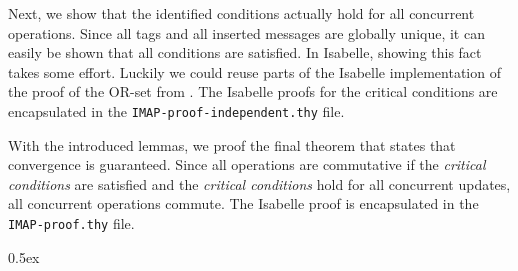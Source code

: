 \documentclass[11pt,a4paper, DIV=11]{article}
\begin{document}
Next, we show that the identified conditions actually hold for all concurrent
operations. Since all tags and all inserted messages are globally unique, it can easily be
shown that all conditions are satisfied.
In Isabelle, showing this fact takes some effort.
Luckily we could reuse parts of the Isabelle implementation of the proof of the
OR-set from \cite{gomes_crdtafp}. The Isabelle proofs for the critical conditions
are encapsulated in the \texttt{IMAP-proof-independent.thy} file.

With the introduced lemmas, we proof the final theorem that states that
convergence is guaranteed. Since all operations are commutative if the
\textit{critical conditions} are
satisfied and the \textit{critical conditions} hold
for all concurrent updates, all concurrent
operations commute.
The Isabelle proof is encapsulated in the \texttt{IMAP-proof.thy} file.

\parindent 0pt\parskip 0.5ex





\end{document}
